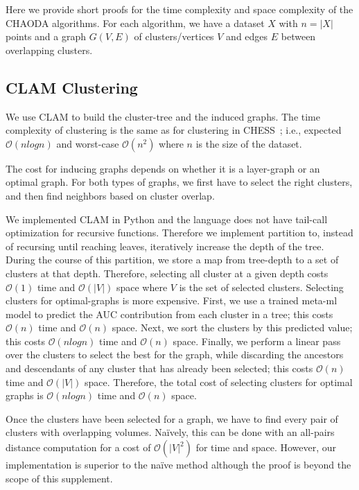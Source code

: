 Here we provide short proofs for the time complexity and space complexity of the CHAODA algorithms.
For each algorithm, we have
a dataset $X$ with $n = |X|$ points and
a graph $G(V, E)$ of clusters/vertices $V$ and edges $E$ between overlapping clusters.


\subsection{CLAM Clustering}

We use CLAM to build the cluster-tree and the induced graphs.
The time complexity of clustering is the same as for clustering in CHESS~\cite{ishaq2019clustered}; i.e., expected $\mathcal{O}(nlogn)$ and worst-case $\mathcal{O}(n^2)$ where $n$ is the size of the dataset.

The cost for inducing graphs depends on whether it is a layer-graph or an optimal graph.
For both types of graphs, we first have to select the right clusters, and then find neighbors based on cluster overlap.

We implemented CLAM in Python and the language does not have tail-call optimization for recursive functions.
Therefore we implement partition to, instead of recursing until reaching leaves, iteratively increase the depth of the tree.
During the course of this partition, we store a map from tree-depth to a set of clusters at that depth.
Therefore, selecting all cluster at a given depth costs $\mathcal{O}(1)$ time and $\mathcal{O}(|V|)$ space where $V$ is the set of selected clusters.
Selecting clusters for optimal-graphs is more expensive.
First, we use a trained meta-ml model to predict the AUC contribution from each cluster in a tree; this costs $\mathcal{O}(n)$ time and $\mathcal{O}(n)$ space.
Next, we sort the clusters by this predicted value; this costs $\mathcal{O}(nlogn)$ time and $\mathcal{O}(n)$ space.
Finally, we perform a linear pass over the clusters to select the best for the graph, while discarding the ancestors and descendants of any cluster that has already been selected; this costs $\mathcal{O}(n)$ time and $\mathcal{O}(|V|)$ space.
Therefore, the total cost of selecting clusters for optimal graphs is $\mathcal{O}(nlogn)$ time and $\mathcal{O}(n)$ space.

Once the clusters have been selected for a graph, we have to find every pair of clusters with overlapping volumes.
Na\"ively, this can be done with an all-pairs distance computation for a cost of $\mathcal{O}(|V|^2)$ for time and space.
However, our implementation is superior to the na\"ive method although the proof is beyond the scope of this supplement.


